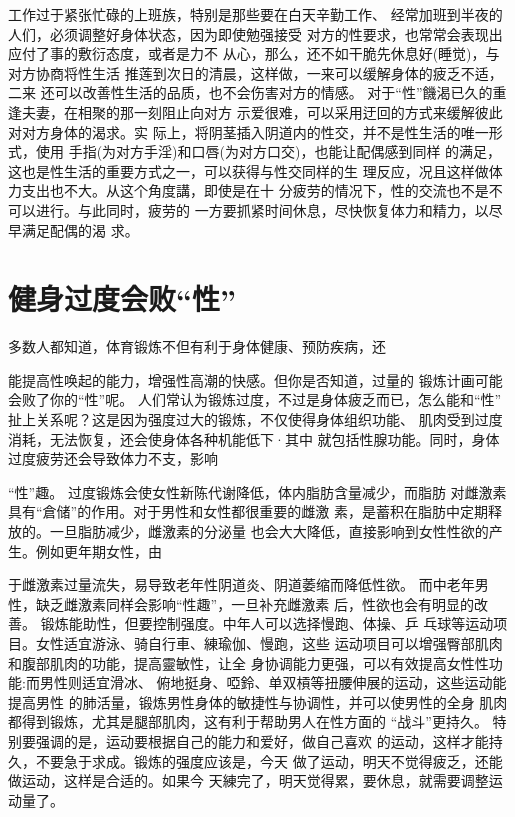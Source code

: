 \documentclass[12pt,UTF8]{ctexbook}
\begin{document}
工作过于紧张忙碌的上班族，特别是那些要在白天辛勤工作、
经常加班到半夜的人们，必须调整好身体状态，因为即使勉强接受
对方的性要求，也常常会表现出应付了事的敷衍态度，或者是力不
从心，那么，还不如干脆先休息好(睡觉)，与对方协商将性生活
推莲到次日的清晨，这样做，一来可以缓解身体的疲乏不适，二来
还可以改善性生活的品质，也不会伤害对方的情感。
对于“性”饑渴已久的重逢夫妻，在相聚的那一刻阻止向对方
示爱很难，可以采用迂回的方式来缓解彼此对对方身体的渴求。实
际上，将阴茎插入阴道内的性交，并不是性生活的唯一形式，使用
手指(为对方手淫)和口唇(为对方口交)，也能让配偶感到同样
的满足，这也是性生活的重要方式之一，可以获得与性交同样的生
理反应，况且这样做体力支出也不大。从这个角度講，即使是在十
分疲劳的情况下，性的交流也不是不可以进行。与此同时，疲劳的
一方要抓紧时间休息，尽快恢复体力和精力，以尽早满足配偶的渴
求。

\section{健身过度会败“性”}

多数人都知道，体育锻炼不但有利于身体健康、预防疾病，还

能提高性唤起的能力，增强性高潮的快感。但你是否知道，过量的
锻炼计画可能会败了你的“性”呢。
人们常认为锻炼过度，不过是身体疲乏而已，怎么能和“性”
扯上关系呢？这是因为强度过大的锻炼，不仅使得身体组织功能、
肌肉受到过度消耗，无法恢复，还会使身体各种机能低下·其中
就包括性腺功能。同时，身体过度疲劳还会导致体力不支，影响

“性”趣。
过度锻炼会使女性新陈代谢降低，体内脂肪含量减少，而脂肪
对雌激素具有“倉储”的作用。对于男性和女性都很重要的雌激
素，是蓄积在脂肪中定期释放的。一旦脂肪减少，雌激素的分泌量
也会大大降低，直接影响到女性性欲的产生。例如更年期女性，由

于雌激素过量流失，易导致老年性阴道炎、阴道萎缩而降低性欲。
而中老年男性，缺乏雌激素同样会影响“性趣”，一旦补充雌激素
后，性欲也会有明显的改善。
锻炼能助性，但要控制强度。中年人可以选择慢跑、体操、乒
乓球等运动项目。女性适宜游泳、骑自行車、練瑜伽、慢跑，这些
运动项目可以增强臀部肌肉和腹部肌肉的功能，提高靈敏性，让全
身协调能力更强，可以有效提高女性性功能:而男性则适宜滑冰、
俯地挺身、啞鈴、单双槓等扭腰伸展的运动，这些运动能提高男性
的肺活量，锻炼男性身体的敏捷性与协调性，并可以使男性的全身
肌肉都得到锻炼，尤其是腿部肌肉，这有利于帮助男人在性方面的
“战斗”更持久。
特别要强调的是，运动要根据自己的能力和爱好，做自己喜欢
的运动，这样才能持久，不要急于求成。锻炼的强度应该是，今天
做了运动，明天不觉得疲乏，还能做运动，这样是合适的。如果今
天練完了，明天觉得累，要休息，就需要调整运动量了。
\end{document}
